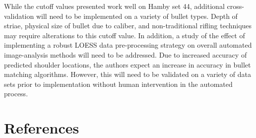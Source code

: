 \documentclass[]{article}
\begin{document}
While the cutoff values presented work well on Hamby set 44, additional
cross-validation will need to be implemented on a variety of bullet
types. Depth of striae, physical size of bullet due to caliber, and
non-traditional rifling techniques may require alterations to this
cutoff value. In addition, a study of the effect of implementing a
robust LOESS data pre-processing strategy on overall automated
image-analysis methods will need to be addressed. Due to increased
accuracy of predicted shoulder locations, the authors expect an increase
in accuracy in bullet matching algorithms. However, this will need to be
validated on a variety of data sets prior to implementation without
human intervention in the automated process.

\section{References}


\end{document}
